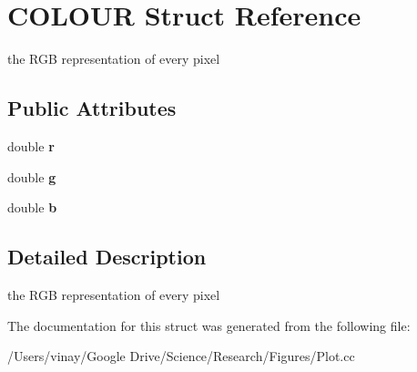 \hypertarget{struct_c_o_l_o_u_r}{}\section{C\+O\+L\+O\+U\+R Struct Reference}
\label{struct_c_o_l_o_u_r}


the R\+G\+B representation of every pixel  


\subsection*{Public Attributes}
\begin{DoxyCompactItemize}
\item 
\hypertarget{struct_c_o_l_o_u_r_a36bcdaa21c239b52ea145b00f6c02fef}{}double {\bfseries r}\label{struct_c_o_l_o_u_r_a36bcdaa21c239b52ea145b00f6c02fef}

\item 
\hypertarget{struct_c_o_l_o_u_r_a7f555cfaee6a22851493dabb733b39aa}{}double {\bfseries g}\label{struct_c_o_l_o_u_r_a7f555cfaee6a22851493dabb733b39aa}

\item 
\hypertarget{struct_c_o_l_o_u_r_aa6afa49758b045d49ca99641097956b3}{}double {\bfseries b}\label{struct_c_o_l_o_u_r_aa6afa49758b045d49ca99641097956b3}

\end{DoxyCompactItemize}


\subsection{Detailed Description}
the R\+G\+B representation of every pixel 

The documentation for this struct was generated from the following file\+:\begin{DoxyCompactItemize}
\item 
/\+Users/vinay/\+Google Drive/\+Science/\+Research/\+Figures/Plot.\+cc\end{DoxyCompactItemize}
